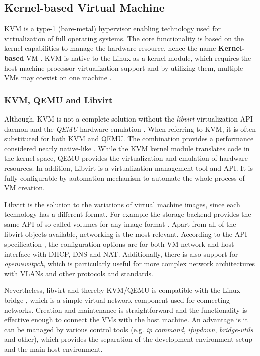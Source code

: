 \subsection{Kernel-based Virtual Machine \label{anal:virtual:kvm}}
KVM is a type-1 (bare-metal) hypervisor enabling technology used for virtualization of full operating systems. The core functionality is based on the kernel capabilities to manage the hardware resource, hence the name \textbf{Kernel-based} VM \cite{redhat:kvm}. KVM is native to the Linux as a kernel module, which requires the host machine processor virtualization support and by utilizing them, multiple VMs may coexist on one machine \cite{article:kvm_qemu}.

\subsubsection*{KVM, QEMU and Libvirt \label{anal:virtual:kvm:combined}}

Although, KVM is not a complete solution without the \textit{libvirt} virtualization API daemon and the \textit{QEMU} hardware emulation \cite{docs:qemu}. When referring to KVM, it is often substituted for both KVM and QEMU. The combination provides a performance considered nearly native-like \cite{article:kvm_qemu}. While the KVM kernel module translates code in the kernel-space, QEMU provides the virtualization and emulation of hardware resources. In addition, Libvirt is a virtualization management tool and API. It is fully configurable by automation mechanism to automate the whole process of VM creation.

Libvirt is the solution to the variations of virtual machine images, since each technology has a different format. For example the storage backend provides the same API of so called volumes for any image format \cite{docs:libvirt:volume}. Apart from all of the libvirt objects available, networking is the most relevant. According to the API specification \cite{docs:libvirt:network}, the configuration options are for both VM network and host interface with DHCP, DNS and NAT. Additionally, there is also support for \textit{openvswitpch}, which is particularly useful for more complex network architectures with VLANs and other protocols and standards.

Nevertheless, libvirt and thereby KVM/QEMU is compatible with the Linux bridge \cite{docs:arch:bridge}, which is a simple virtual network component used for connecting networks. Creation and maintenance is straightforward and the functionality is effective enough to connect the VMs with the host machine. An advantage is it can be managed by various control tools (e.g. \textit{ip command}, \textit{ifupdown}, \textit{bridge-utils} and other), which provides the separation of the development environment setup and the main host environment.

